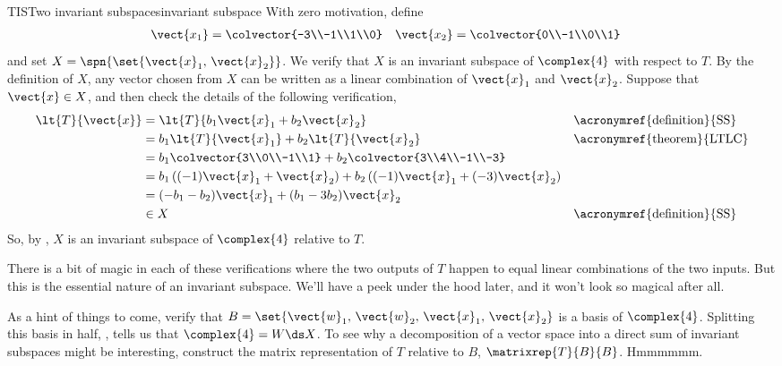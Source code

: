 \begin{example}{TIS}{Two invariant subspaces}{invariant subspace}
%
With zero motivation, define
%
\begin{align*}
\vect{x_1}&=\colvector{-3\\-1\\1\\0}
&
\vect{x_2}&=\colvector{0\\-1\\0\\1}
\end{align*}
%
and set $X=\spn{\set{\vect{x}_1,\,\vect{x}_2}}$.  We verify that $X$ is an invariant subspace of $\complex{4}$ with respect to $T$.  By the definition of $X$, any vector chosen from $X$ can be written as a linear combination of $\vect{x}_1$ and $\vect{x}_2$.  Suppose that $\vect{x}\in X$, and then check the details of the following verification,
%
\begin{align*}
\lt{T}{\vect{x}}
&=\lt{T}{b_1\vect{x}_1+b_2\vect{x}_2}&&\text{\acronymref{definition}{SS}}\\
&=b_1\lt{T}{\vect{x}_1}+b_2\lt{T}{\vect{x}_2}&&\text{\acronymref{theorem}{LTLC}}\\
&=b_1\colvector{3\\0\\-1\\1}+b_2\colvector{3\\4\\-1\\-3}\\
&=b_1\left((-1)\vect{x}_1+\vect{x}_2\right)+b_2\left((-1)\vect{x}_1+(-3)\vect{x}_2\right)\\
&=(-b_1-b_2)\vect{x}_1+(b_1-3b_2)\vect{x}_2\\
&\in X&&\text{\acronymref{definition}{SS}}
\end{align*}
%
So, by , $X$ is an invariant subspace of $\complex{4}$ relative to $T$. \par
%
There is a bit of magic in each of these verifications where the two outputs of $T$ happen to equal linear combinations of the two inputs.  But this is the essential nature of an invariant subspace.  We'll have a peek under the hood later, and it won't look so magical after all.\par
%
As a hint of things to come, verify that $B=\set{\vect{w}_1,\,\vect{w}_2,\,\vect{x}_1,\,\vect{x}_2}$ is a basis of $\complex{4}$.  Splitting this basis in half, , tells us that $\complex{4}=W\ds X$.  To see why a decomposition of a vector space into a direct sum of invariant subspaces might be interesting, construct the matrix representation of $T$ relative to $B$, $\matrixrep{T}{B}{B}$.  Hmmmmmm.
%
\end{example}
